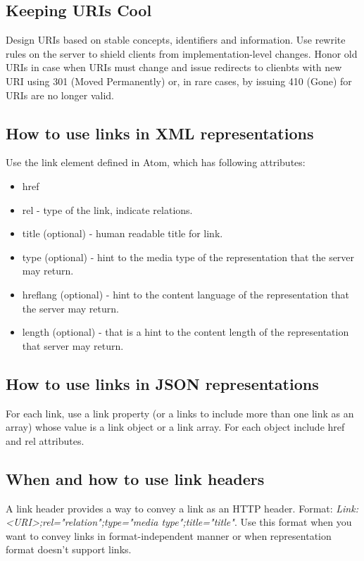 \documentclass[11pt,a4paper]{article}
\begin{document}
\subsection{Keeping URIs Cool}
Design URIs based on stable concepts, identifiers and information. Use rewrite rules on the server to shield clients from implementation-level changes. Honor old URIs in case when URIs must change and issue redirects to clienbts with new  URI using 301 (Moved Permanently) or, in rare cases, by issuing 410 (Gone) for URIs are no longer valid.

\subsection{How to use links in XML representations}
Use the link element defined in Atom, which has following attributes:
\begin{itemize}
	\item href
	\item rel - type of the link, indicate relations.
	\item title (optional) - human readable title for link.
	\item type (optional) - hint to the media type of the representation that the server may return.
	\item hreflang (optional) - hint to the content language of the representation that the server may return.
	\item length (optional) - that is a hint to the content length of the representation that server may return.
\end{itemize}

\subsection{How to use links in JSON representations}
For each link, use a link property (or a links to include more than one link as an array) whose value is a link object or a link array. For each object include href and rel attributes.

\subsection{When and how to use link headers }
A link header provides a way to convey a link as an HTTP header. Format: \textit{Link: <URI>;rel="{relation}";type="{media type}";title="{title}"}. Use this format when you want to convey links in format-independent manner or when representation format doesn't support links.
\end{document}
